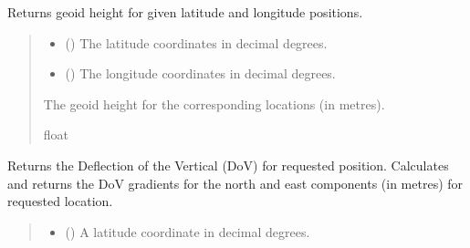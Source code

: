 \documentclass[letterpaper,10pt,english]{sphinxmanual}
\begin{document}
\begin{fulllineitems}
\begin{fulllineitems}
\label{\detokenize{modules/earth/geoid:qnav.earth.geoid.GeoidDummy.get_height_vec}}
\pysigstartsignatures
{}
\pysigstopsignatures
\sphinxAtStartPar
Returns geoid height for given latitude and longitude positions.
\begin{quote}\begin{description}
\begin{itemize}
\item {} 
\sphinxAtStartPar
{} () \textendash{} The latitude coordinates in decimal degrees.

\item {} 
\sphinxAtStartPar
{} () \textendash{} The longitude coordinates in decimal degrees.

\end{itemize}

\sphinxAtStartPar
The geoid height for the corresponding locations (in metres).

\sphinxAtStartPar
float

\end{description}\end{quote}

\end{fulllineitems}


\begin{fulllineitems}
\label{\detokenize{modules/earth/geoid:qnav.earth.geoid.GeoidDummy.get_dov}}
\pysigstartsignatures
{}
\pysigstopsignatures
\sphinxAtStartPar
Returns the Deflection of the Vertical (DoV) for requested position.
Calculates and returns the DoV gradients for the north and east
components (in metres) for requested location.
\begin{quote}\begin{description}
\begin{itemize}
\item {} 
\sphinxAtStartPar
{} () \textendash{} A latitude coordinate in decimal degrees.


\end{itemize}
\end{description}
\end{quote}
\end{fulllineitems}
\end{fulllineitems}
\end{document}
